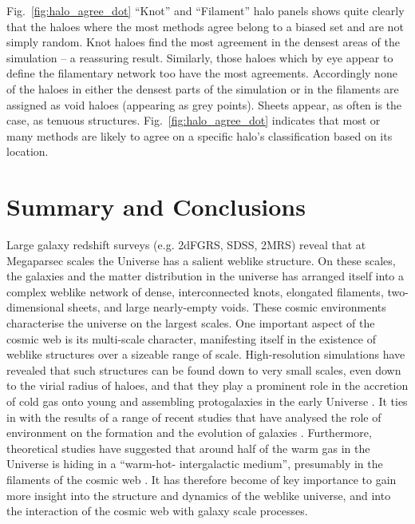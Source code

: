 Fig.~\ref{fig:halo_agree_dot} ``Knot'' and ``Filament'' halo panels shows quite clearly that the haloes where the most methods agree belong to a biased set and are not simply random. Knot haloes find the most agreement in the densest areas of the simulation -- a reassuring result. Similarly, those haloes which by eye appear to define the filamentary network too have the most agreements. Accordingly none of the haloes in either the densest parts of the simulation or in the filaments are assigned as void haloes (appearing as grey points). Sheets appear, as often is the case, as tenuous structures. Fig.~\ref{fig:halo_agree_dot} indicates that most or many methods are likely to agree on a specific halo's classification based on its location.

\section{Summary and Conclusions}
Large galaxy redshift surveys (e.g. 2dFGRS, SDSS, 2MRS) reveal that at Megaparsec scales
the Universe has a salient weblike structure. On these scales, the galaxies and  the matter distribution in the
universe has arranged itself into a complex weblike network of dense, interconnected knots,
elongated filaments, two-dimensional sheets, and  large nearly-empty voids. These cosmic environments characterise the universe on the largest scales. 
One important aspect of the cosmic web is its multi-scale character, manifesting itself in the existence of weblike
structures over a sizeable range of scale. High-resolution simulations have revealed
that such structures can be found down to very small scales, even down to the virial radius
of haloes, and that they play a prominent role in the accretion of cold gas onto young and
assembling protogalaxies in the early Universe \citep{2012MNRAS.422.1732D}. It ties in with the results of a range of recent studies that have analysed the role of environment on the formation and the evolution of galaxies \citep[e.g.][]{2013ApJ...776...71C,2015MNRAS.448.3665E,2015ApJ...800..112G,2015ApJ...800L...4C,2016MNRAS.455..127M,2017A&A...597A..86P}. Furthermore, theoretical studies have suggested that around half of the warm gas in the Universe is hiding in a ``warm-hot- intergalactic medium'', presumably in the filaments of the cosmic web \citep[e.g.][]{2015Natur.528..105E}. It has therefore become of key importance to gain more insight into the structure and dynamics of the weblike universe, and into the interaction of the cosmic web with galaxy scale processes.


